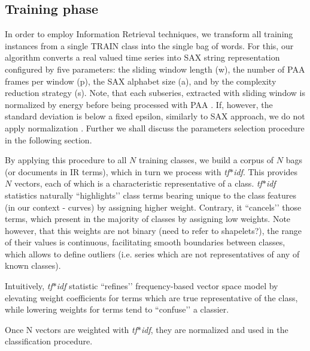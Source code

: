 \documentclass{llncs}
\begin{document}
\subsection{Training phase}
In order to employ Information Retrieval techniques, we transform all training instances from a
single TRAIN class into the single bag of words. For this, our algorithm converts a real valued time
series into SAX string representation configured by five parameters: the sliding window length (w),
the number of PAA frames per window (p), the SAX alphabet size (a), and by the complexity reduction
strategy (s). Note, that each subseries, extracted with sliding window is normalized by energy
before being processed with PAA \cite{goldin_kanellakis}. If, however, the standard deviation is
below a fixed epsilon, similarly to SAX approach, we do not apply normalization
\cite{sax}. Further we shall discuss the parameters selection procedure in the following section.

By applying this procedure to all $N$ training classes, we build a corpus of $N$ bags (or documents in
IR terms), which in turn we process with \textit{tf$\ast$idf}. This provides $N$ vectors, each of
which is a characteristic representative of a class. \textit{tf$\ast$idf} statistics naturally
``highlights’’ class terms bearing unique to the class features (in our context - curves) by
assigning higher weight. Contrary, it ``cancels’’ those terms, which present in the majority of
classes by assigning low weights. Note however, that this weights are not binary (need to refer to
shapelets?), the range of their values is continuous, facilitating smooth boundaries between
classes, which allows to define outliers (i.e. series which are not representatives of any of known
classes).

Intuitively, \textit{tf$\ast$idf} statistic ``refines’’ frequency-based vector space model by
elevating weight coefficients for terms which are true representative of the class, while lowering
weights for terms tend to ``confuse’’ a classier.

Once N vectors are weighted with \textit{tf$\ast$idf}, they are normalized and used in the
classification procedure.
\end{document}

